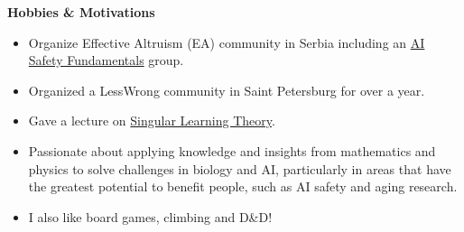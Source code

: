 \documentclass[12pt]{article}
\begin{document}
\vspace{1em}

\noindent \textbf{\Large Hobbies \& Motivations}
\begin{itemize}
    \item Organize Effective Altruism (EA) community in Serbia including an  
          \href{https://course.aisafetyfundamentals.com/alignment?_gl=1*1xg9r59*_ga*MTgyMzIzOTUwNS4xNjk4MzQwMDQy*_ga_LGQ75B1P00*MTcwNjcxMTA1OC4zLjEuMTcwNjcxMTA5MC4wLjAuMA..}{AI Safety Fundamentals} group.
    \item Organized a LessWrong community in Saint Petersburg for over a year. \href{https://t.me/lwspbmeetup}{\faTelegram}
    \item Gave a lecture on \href{https://arxiv.org/abs/2010.11560}{Singular Learning Theory}. \href{https://docs.google.com/presentation/d/1JL1xWLcikkNfF525fB3_898bV1WCuJnnCUft8oKcJ-M/edit?usp=sharing}{\faChalkboardTeacher}
    \item Passionate about applying knowledge and insights from mathematics and physics to solve challenges in biology and AI, particularly in areas that have the greatest potential to benefit people, such as AI safety and aging research.
    \item I also like board games, climbing and D\&D!
\end{itemize}
\end{document}
